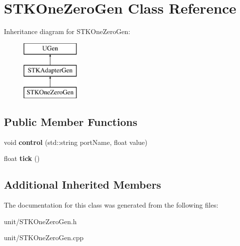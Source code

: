 \hypertarget{classSTKOneZeroGen}{}\section{S\+T\+K\+One\+Zero\+Gen Class Reference}
\label{classSTKOneZeroGen}
Inheritance diagram for S\+T\+K\+One\+Zero\+Gen\+:\begin{figure}[H]
\begin{center}
\leavevmode
\includegraphics[height=3.000000cm]{classSTKOneZeroGen}
\end{center}
\end{figure}
\subsection*{Public Member Functions}
\begin{DoxyCompactItemize}
\item 
void {\bfseries control} (std\+::string port\+Name, float value)\hypertarget{classSTKOneZeroGen_a44bc26cf6f0e7218f9f14447c957dce4}{}\label{classSTKOneZeroGen_a44bc26cf6f0e7218f9f14447c957dce4}

\item 
float {\bfseries tick} ()\hypertarget{classSTKOneZeroGen_ab1118ea13c6892f49c8f92f017b82908}{}\label{classSTKOneZeroGen_ab1118ea13c6892f49c8f92f017b82908}

\end{DoxyCompactItemize}
\subsection*{Additional Inherited Members}


The documentation for this class was generated from the following files\+:\begin{DoxyCompactItemize}
\item 
unit/S\+T\+K\+One\+Zero\+Gen.\+h\item 
unit/S\+T\+K\+One\+Zero\+Gen.\+cpp\end{DoxyCompactItemize}
